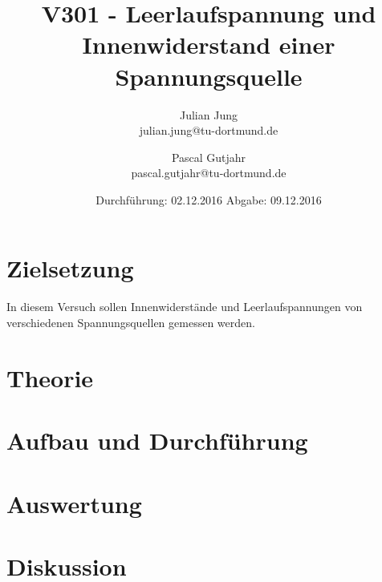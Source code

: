 

\title{V301 - Leerlaufspannung und Innenwiderstand einer Spannungsquelle}
\author{Julian Jung \\ julian.jung@tu-dortmund.de
  \and Pascal Gutjahr \\ pascal.gutjahr@tu-dortmund.de}
  \date{Durchführung: 02.12.2016
  \hspace{3em}
  Abgabe: 09.12.2016}
  
\maketitle
\newpage
\tableofcontents
\newpage
\section{Zielsetzung}
In diesem Versuch sollen Innenwiderstände und Leerlaufspannungen von verschiedenen
Spannungsquellen gemessen werden.
\section{Theorie}
 
\section{Aufbau und Durchführung}
 
\section{Auswertung}
 
\section{Diskussion}
% 
\printbibliography

